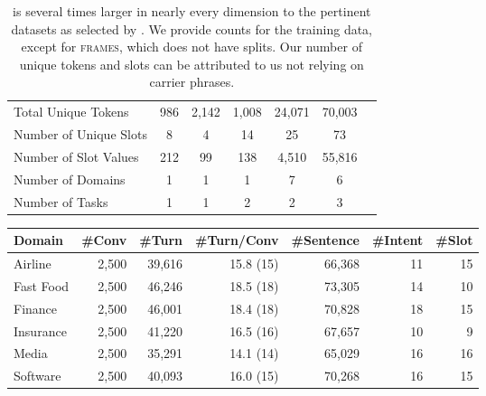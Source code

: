 {{\begin{table*}[t!]
\begin{tabular}{ l c c c c c a}
		Total Unique Tokens & 986 & 2,142   & 1,008& 24,071 & 70,003\\%
		Number of Unique Slots & 8 & 4  & 14 & 25 & 73\\%
		Number of Slot Values & 212 & 99  & 138 & 4,510 & 55,816\\%
		Number of Domains & 1 & 1  & 1 & 7 & 6 \\
		Number of Tasks & 1 & 1  & 2 & 2 & 3 \\
		\hline
	\end{tabular}
	\caption{\multidogo is several times larger in nearly every dimension to the pertinent datasets as selected by \citet{budzianowski2018multiwoz}.  We provide counts for the training data, except for \textsc{frames}, which does not have splits.  Our number of unique tokens and slots can be attributed to us not relying on carrier phrases.}
	\label{Comparative}
\end{table*}


\begin{table*}[h!]
	\small
	\centering
	\begin{tabular}{l r r r r r r }
		\textbf{Domain} & \textbf{\#Conv} & \textbf{\#Turn }& \textbf{\#Turn/Conv} &\textbf{ \#Sentence} & \textbf{\#Intent} & \textbf{\#Slot} \\  
		\hline
		Airline & 2,500 & 39,616 & 15.8 (15) & 66,368 & 11 & 15    \\
		Fast Food & 2,500 & 46,246 & 18.5 (18) & 73,305 & 14 & 10   \\
		Finance & 2,500 & 46,001 &  18.4 (18) & 70,828 & 18 & 15    \\
		Insurance & 2,500 & 41,220 & 16.5 (16) & 67,657 & 10 & 9  \\
		Media & 2,500 & 35,291 & 14.1 (14) & 65,029 & 16 & 16     \\
		Software & 2,500 & 40,093 & 16.0 (15) & 70,268 & 16 & 15    \\
		

\end{tabular}
\end{table*}}}
